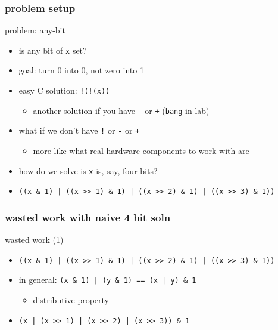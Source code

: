 \usetikzlibrary{arrows.meta,calc,circuits.logic.US,fit,matrix,positioning}

\subsubsection{problem setup}


\begin{frame}[fragile,label=anyBit]{problem: any-bit}
    \begin{itemize}
        \item is any bit of {\tt x} set?
    \item goal: turn 0 into 0, not zero into 1
    \item easy C solution: \lstinline|!(!(x))|
        \begin{itemize}
        \item another solution if you have \lstinline|-| or \lstinline|+| (\texttt{bang} in lab)
        \end{itemize}
    \item what if we don't have \lstinline|!| or \lstinline|-| or \lstinline|+|
        \begin{itemize}
        \item more like what real hardware components to work with are
        \end{itemize}
    \vspace{.5cm}
    \item<2-> how do we solve is {\tt x} is, say, four bits?
    \item<3-> {\small\lstinline+((x & 1) | ((x >> 1) & 1) | ((x >> 2) & 1) | ((x >> 3) & 1))+}
    \end{itemize}
\end{frame}

\subsubsection{wasted work with naive 4 bit soln}

\begin{frame}[fragile,label=wastedAnyBitAnd]{wasted work (1)}
    \begin{itemize}
    \item {\small\lstinline+((x & 1) | ((x >> 1) & 1) | ((x >> 2) & 1) | ((x >> 3) & 1))+}
    \item in general: \lstinline+(x & 1) | (y & 1) == (x | y) & 1+
        \begin{itemize}
        \item distributive property
        \end{itemize}
        \vspace{.5cm}
    \item<2-> {\small\lstinline+(x | (x >> 1) | (x >> 2) | (x >> 3)) & 1+}
    \end{itemize}
\end{frame}

